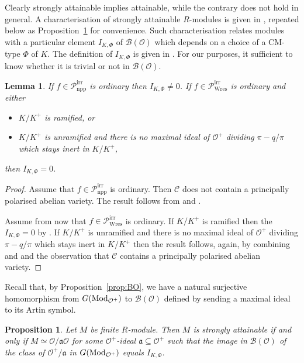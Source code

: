 \documentclass[11pt]{amsart}
\def\Mod{\mathop{\rm Mod}\nolimits}
\newcommand\cB{\mathcal{B}}
\newcommand\cC{\mathcal{C}}
\newcommand\cO{\mathcal{O}}
\theoremstyle{plain}
\newtheorem{lemma}[theorem]{Lemma}
\newtheorem{proposition}[theorem]{Proposition}
\theoremstyle{definition}
\newcommand\PirrA{\mathcal{P}^\mathrm{irr}_\mathrm{npp}}
\newcommand\PirrB{\mathcal{P}^\mathrm{irr}_\mathrm{Wres}}
\begin{document}
Clearly strongly attainable implies attainable, while the contrary does not hold in general.
A characterisation of strongly attainable $R$-modules is given in \cite[Prop.~5.7]{Howe95}, repeated below as Proposition~\ref{prop:strong_att} for convenience.
Such characterisation relates modules with a particular element $I_{K,\Phi}$ of $\cB(\cO)$ which depends on a choice of a CM-type $\Phi$ of $K$.
The definition of $I_{K,\Phi}$ is given in \cite[Def.~5.2]{Howe95}.
For our purposes, it sufficient to know whether it is trivial or not in $\cB(\cO)$.
\begin{lemma}\label{lem:IK}
    If $f\in \PirrA$ is ordinary then $I_{K,\Phi} \neq 0$.
    If $f\in \PirrB$ is ordinary and either 
    \begin{itemize}
        \item $K/K^+$ is ramified, or
        \item $K/K^+$ is unramified and there is no maximal ideal of $\cO^+$ dividing $\pi-q/\pi$ which stays inert in $K/K^+$,
    \end{itemize}
    then $I_{K,\Phi} = 0$.
\end{lemma}
\begin{proof}
    Assume that $f \in \PirrA$ is ordinary.
    Then $\cC$ does not contain a principally polarised abelian variety.
    The result follows from \cite[Prop.~11.3]{Howe95} and \cite[Cor.~11.4]{Howe95}.

    Assume from now that $f\in \PirrB$ is ordinary.
    If $K/K^+$ is ramified then the $I_{K,\Phi}=0$ by \cite[Prop.~11.1]{Howe95}.
    If $K/K^+$ is unramified and there is no maximal ideal of $\cO^+$ dividing $\pi-q/\pi$ which stays inert in $K/K^+$ then the result follows, again, by combining \cite[Prop.~11.3]{Howe95} and \cite[Cor.~11.4]{Howe95} and the observation that $\cC$ contains a principally polarised abelian variety.
\end{proof}

Recall that, by Proposition~\ref{prop:BO}, we have a natural surjective homomorphism from $G(\Mod_{\cO^+})$ to $\cB(\cO)$ defined by sending a maximal ideal to its Artin symbol.

\begin{proposition}{\cite[Prop.~5.7]{Howe95}}\label{prop:strong_att}
    Let $M$ be finite $R$-module.
    Then $M$ is strongly attainable if and only if $M\simeq \cO/\mathfrak{a}\cO$ for some $\cO^+$-ideal $\mathfrak{a} \subseteq \cO^+$ such that the image in $\cB(\cO)$ of the class of $\cO^+/\mathfrak{a}$ in $G(\Mod_{\cO^+})$ equals $I_{K,\Phi}$.
\end{proposition}
\end{document}
